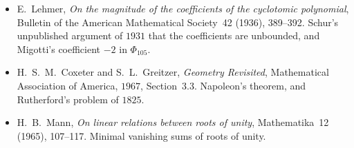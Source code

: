 \begin{itemize}
\item E.~Lehmer, \emph{On the magnitude of the coefficients of the cyclotomic polynomial}, Bulletin of the American Mathematical Society~42 (1936), 389--392. Schur's unpublished argument of $1931$ that the coefficients are unbounded, and Migotti's coefficient $-2$ in $\Phi_{105}$.
\item H.~S.~M.~Coxeter and S.~L.~Greitzer, \emph{Geometry Revisited}, Mathematical Association of America, $1967$, Section~3.3. Napoleon's theorem, and Rutherford's problem of $1825$.
\item H.~B.~Mann, \emph{On linear relations between roots of unity}, Mathematika~12 (1965), 107--117. Minimal vanishing sums of roots of unity.
\end{itemize}
